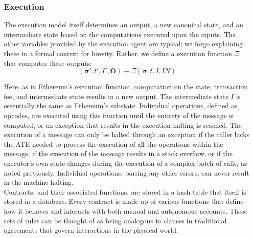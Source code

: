\documentclass[conference]{IEEEtran}
\begin{document}
\subsubsection{Execution}
The execution model itself determines an output, a new canonical state, and an intermediate state based on the computations executed upon the inputs. The other variables provided by the execution agent are typical; we forgo explaining these in a formal context for brevity. Rather, we define a execution function $\Xi$ that computes these outputs:
\begin{equation}
(\boldsymbol{\sigma}', t', I', \mathbf{O}) \equiv \Xi(\boldsymbol{\sigma}, t, I, IN)
\end{equation}

Here, as in Ethereum's execution function, computation on the state, transaction fee, and intermediate state results in a new output. The intermediate state $I$ is essentially the same as Ethereum's substate. Individual operations, defined as opcodes, are executed using this function until the entirety of the message is computed, or an exception that results in the execution halting is reached. The execution of a message can only be halted through an exception if the caller lacks the ATE needed to process the execution of all the operations within the message, if the execution of the message results in a stack overflow, or if the executor's own state changes during the execution of a complex batch of calls, as noted previously. Individual operations, barring any other errors, can never result in the machine halting.\\

Contracts, and their associated functions, are stored in a hash table that itself is stored in a database. Every contract is made up of various functions that define how it behaves and interacts with both manual and autonomous accounts. These sets of rules can be thought of as being analogous to clauses in traditional agreements that govern interactions in the physical world.\\
\end{document}
